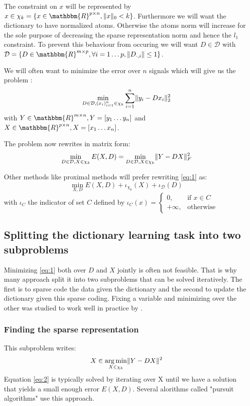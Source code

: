 \documentclass[a4paper,11pt]{article}
\newcommand{\RR}{\mathbbm{R}} %
\DeclarePairedDelimiter\norm{\lVert}{\rVert} %
\DeclareMathOperator*{\argmin}{arg\,min} %
\begin{document}
The constraint on $x$ will be represented by $x \in \chi_k = \{ x \in \RR^{p \times n}, \norm{x}_0<k \}$.
Furthermore we will want the dictionary to have normalized atoms.
Otherwise the atoms norm will increase for the sole purpose of decreasing the sparse representation norm and hence the $l_1$ constraint.
To prevent this behaviour from occuring we  will want $ D \in \mathcal{D} $ with $\mathcal{D} = \{ D \in \RR^{m \times p}, \forall i=1 \ldots p, \norm{D_{\cdot,i}} \leq 1 \}$.

We will often want to minimize the error over $n$ signals which will give us the problem :
$$\min\limits_{D \in \mathcal{D}, (x_i)_{i=1}^n \in \chi_k} \sum\limits_{i=1}^n \norm{y_i - Dx_i}_2^2$$
with $Y \in \RR^{m \times n}, Y = [y_1 \ldots y_n]$ and $X \in \RR^{p \times n}, X = [x_1 \ldots x_n]$.

The problem now rewrites in matrix form:
\begin{equation} \label{eq:1}
\min\limits_{D \in \mathcal{D}, X \in \chi_k} E(X,D) = \min\limits_{D \in \mathcal{D}, X \in \chi_k} \norm{Y - DX}_F^2
\end{equation}

Other methods like proximal methods will prefer rewriting \ref{eq:1} as:
$$\min_{X, D} E(X,D) + \iota_{\chi_k}(X) + \iota_{\mathcal{D}}(D)$$
with $\iota_C$ the indicator of set $C$ defined by
$ \iota_C(x) =
\begin{cases}
0, & \text{if } x \in C\\
+ \infty, & \text{otherwise}
\end{cases}
$

\subsection{Splitting the dictionary learning task into two subproblems}
Minimizing \ref{eq:1} both over $D$ and $X$ jointly is often not feasible.
That is why many approach split it into two subproblems that can be solved iteratively.
The first is to sparse code the data given the dictionary and the second to update the dictionary given this sparse coding. Fixing a variable and minimizing over the other was studied to work well in practice by \cite{lee06}.

\subsubsection{Finding the sparse representation}
This subproblem writes:
\begin{equation} \label{eq:2}
X \in \argmin_{X \in \chi_k} \norm{Y - DX}^2
\end{equation}
Equation \ref{eq:2} is typically solved by iterating over X until we have a solution that yields a small enough error $E(X,D)$.
Several alorithms called "pursuit algorithms" use this approach.
\end{document}
